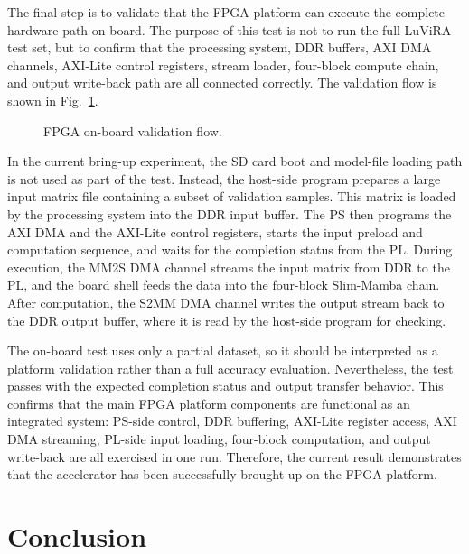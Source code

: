 \documentclass[11pt,twoside]{eitExjobb}
\makeatletter
\renewcommand\chapter{\clearpage\sh@chapter}
\makeatother
\begin{document}
The final step is to validate that the FPGA platform can execute the complete hardware
path on board. The purpose of this test is not to run the full LuViRA test set, but to
confirm that the processing system, DDR buffers, AXI DMA channels, AXI-Lite control
registers, stream loader, four-block compute chain, and output write-back path are all
connected correctly. The validation flow is shown in Fig.~\ref{fig:board_validate}.

\begin{figure}[H]
  \centering
  
  \caption{FPGA on-board validation flow.}
  \label{fig:board_validate}
\end{figure}

In the current bring-up experiment, the SD card boot and model-file loading path is not
used as part of the test. Instead, the host-side program prepares a large input matrix
file containing a subset of validation samples. This matrix is loaded by the processing
system into the DDR input buffer. The PS then programs the AXI DMA and the AXI-Lite
control registers, starts the input preload and computation sequence, and waits for the
completion status from the PL. During execution, the MM2S DMA channel streams the input
matrix from DDR to the PL, and the board shell feeds the data into the four-block
Slim-Mamba chain. After computation, the S2MM DMA channel writes the output stream back
to the DDR output buffer, where it is read by the host-side program for checking.

The on-board test uses only a partial dataset, so it should be interpreted as a platform
validation rather than a full accuracy evaluation. Nevertheless, the test passes with
the expected completion status and output transfer behavior. This confirms that the
main FPGA platform components are functional as an integrated system: PS-side control,
DDR buffering, AXI-Lite register access, AXI DMA streaming, PL-side input loading,
four-block computation, and output write-back are all exercised in one run. Therefore,
the current result demonstrates that the accelerator has been successfully brought up on
the FPGA platform.
\chapter{Conclusion}

\section{Conclusion}
\end{document}
